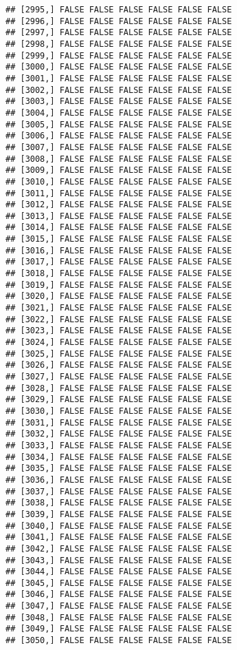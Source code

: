 \documentclass[
]{article}
\begin{document}
\begin{verbatim}
## [2995,] FALSE FALSE FALSE FALSE FALSE FALSE
## [2996,] FALSE FALSE FALSE FALSE FALSE FALSE
## [2997,] FALSE FALSE FALSE FALSE FALSE FALSE
## [2998,] FALSE FALSE FALSE FALSE FALSE FALSE
## [2999,] FALSE FALSE FALSE FALSE FALSE FALSE
## [3000,] FALSE FALSE FALSE FALSE FALSE FALSE
## [3001,] FALSE FALSE FALSE FALSE FALSE FALSE
## [3002,] FALSE FALSE FALSE FALSE FALSE FALSE
## [3003,] FALSE FALSE FALSE FALSE FALSE FALSE
## [3004,] FALSE FALSE FALSE FALSE FALSE FALSE
## [3005,] FALSE FALSE FALSE FALSE FALSE FALSE
## [3006,] FALSE FALSE FALSE FALSE FALSE FALSE
## [3007,] FALSE FALSE FALSE FALSE FALSE FALSE
## [3008,] FALSE FALSE FALSE FALSE FALSE FALSE
## [3009,] FALSE FALSE FALSE FALSE FALSE FALSE
## [3010,] FALSE FALSE FALSE FALSE FALSE FALSE
## [3011,] FALSE FALSE FALSE FALSE FALSE FALSE
## [3012,] FALSE FALSE FALSE FALSE FALSE FALSE
## [3013,] FALSE FALSE FALSE FALSE FALSE FALSE
## [3014,] FALSE FALSE FALSE FALSE FALSE FALSE
## [3015,] FALSE FALSE FALSE FALSE FALSE FALSE
## [3016,] FALSE FALSE FALSE FALSE FALSE FALSE
## [3017,] FALSE FALSE FALSE FALSE FALSE FALSE
## [3018,] FALSE FALSE FALSE FALSE FALSE FALSE
## [3019,] FALSE FALSE FALSE FALSE FALSE FALSE
## [3020,] FALSE FALSE FALSE FALSE FALSE FALSE
## [3021,] FALSE FALSE FALSE FALSE FALSE FALSE
## [3022,] FALSE FALSE FALSE FALSE FALSE FALSE
## [3023,] FALSE FALSE FALSE FALSE FALSE FALSE
## [3024,] FALSE FALSE FALSE FALSE FALSE FALSE
## [3025,] FALSE FALSE FALSE FALSE FALSE FALSE
## [3026,] FALSE FALSE FALSE FALSE FALSE FALSE
## [3027,] FALSE FALSE FALSE FALSE FALSE FALSE
## [3028,] FALSE FALSE FALSE FALSE FALSE FALSE
## [3029,] FALSE FALSE FALSE FALSE FALSE FALSE
## [3030,] FALSE FALSE FALSE FALSE FALSE FALSE
## [3031,] FALSE FALSE FALSE FALSE FALSE FALSE
## [3032,] FALSE FALSE FALSE FALSE FALSE FALSE
## [3033,] FALSE FALSE FALSE FALSE FALSE FALSE
## [3034,] FALSE FALSE FALSE FALSE FALSE FALSE
## [3035,] FALSE FALSE FALSE FALSE FALSE FALSE
## [3036,] FALSE FALSE FALSE FALSE FALSE FALSE
## [3037,] FALSE FALSE FALSE FALSE FALSE FALSE
## [3038,] FALSE FALSE FALSE FALSE FALSE FALSE
## [3039,] FALSE FALSE FALSE FALSE FALSE FALSE
## [3040,] FALSE FALSE FALSE FALSE FALSE FALSE
## [3041,] FALSE FALSE FALSE FALSE FALSE FALSE
## [3042,] FALSE FALSE FALSE FALSE FALSE FALSE
## [3043,] FALSE FALSE FALSE FALSE FALSE FALSE
## [3044,] FALSE FALSE FALSE FALSE FALSE FALSE
## [3045,] FALSE FALSE FALSE FALSE FALSE FALSE
## [3046,] FALSE FALSE FALSE FALSE FALSE FALSE
## [3047,] FALSE FALSE FALSE FALSE FALSE FALSE
## [3048,] FALSE FALSE FALSE FALSE FALSE FALSE
## [3049,] FALSE FALSE FALSE FALSE FALSE FALSE
## [3050,] FALSE FALSE FALSE FALSE FALSE FALSE

\end{verbatim}
\end{document}
